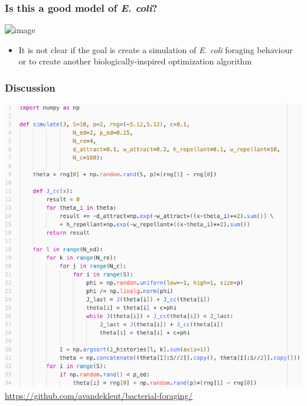 \documentclass{beamer}
\begin{document}
\begin{frame}
\frametitle{Is this a good model of \textit{E. coli}?}
\begin{center}
\includegraphics<1->[scale=0.3]{assets/yikes}
\end{center}
\begin{itemize}
  \item<1-> It is not clear if the goal is create a simulation of \textit{E. coli} foraging behaviour or to create another biologically-inspired optimization algorithm
\end{itemize}
\end{frame}

\begin{frame}
\frametitle{Discussion}
\begin{center}
\includegraphics[scale=0.25]{assets/code}
\href{github.com/avandekleut/bacterial-foraging}{https://github.com/avandekleut/bacterial-foraging/}
\end{center}
\end{frame}
\end{document}

